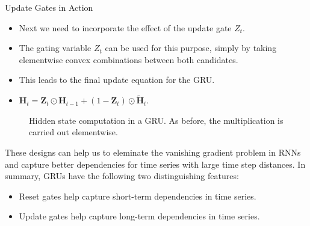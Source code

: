 \begin{vbframe}{Update Gates in Action}
  \begin{itemize}
  \item Next we need to incorporate the effect of the update gate $Z_t$.
  \item The gating variable $Z_t$ can be used for this purpose, simply by taking elementwise convex combinations between both candidates. 
  \item This leads to the final update equation for the GRU.
  \item $\mathbf{H}_t = \mathbf{Z}_t \odot \mathbf{H}_{t-1}  + (1 - \mathbf{Z}_t) \odot \tilde{\mathbf{H}}_t.$
  \end{itemize}
   \begin{figure}
      \centering
      \caption{\footnotesize{Hidden state computation in a GRU. As before, the multiplication is carried out elementwise.}}
  \end{figure}
  
  These designs can help us to eleminate the vanishing gradient problem in RNNs and capture better dependencies for time series with large time step distances. In summary, GRUs have the following two distinguishing features:
  \begin{itemize}
    \item Reset gates help capture short-term dependencies in time series.
    \item Update gates help capture long-term dependencies in time series.
  \end{itemize}


\end{vbframe}
